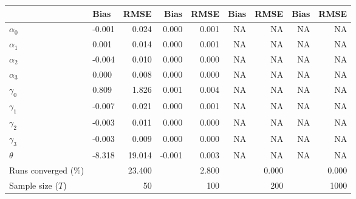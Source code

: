 
\begin{tabular}[t]{llrrrrrrr}
\toprule
  & Bias & RMSE & Bias & RMSE & Bias & RMSE & Bias & RMSE\\
\midrule
$\alpha_{0}$ & -0.001 & 0.024 & 0.000 & 0.001 & NA & NA & NA & NA\\
$\alpha_{1}$ & 0.001 & 0.014 & 0.000 & 0.001 & NA & NA & NA & NA\\
$\alpha_{2}$ & -0.004 & 0.010 & 0.000 & 0.000 & NA & NA & NA & NA\\
$\alpha_{3}$ & 0.000 & 0.008 & 0.000 & 0.000 & NA & NA & NA & NA\\
$\gamma_{0}$ & 0.809 & 1.826 & 0.001 & 0.004 & NA & NA & NA & NA\\
$\gamma_{1}$ & -0.007 & 0.021 & 0.000 & 0.001 & NA & NA & NA & NA\\
$\gamma_{2}$ & -0.003 & 0.011 & 0.000 & 0.000 & NA & NA & NA & NA\\
$\gamma_{3}$ & -0.003 & 0.009 & 0.000 & 0.000 & NA & NA & NA & NA\\
$\theta$ & -8.318 & 19.014 & -0.001 & 0.003 & NA & NA & NA & NA\\
Runs converged (\%) &  & 23.400 &  & 2.800 &  & 0.000 &  & 0.000\\
Sample size ($T$) &  & 50 &  & 100 &  & 200 &  & 1000\\
\bottomrule
\end{tabular}
